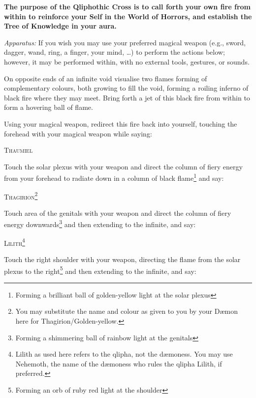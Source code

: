 
\textbf{The purpose of the Qliphothic Cross is to call forth your own fire from within to reinforce your Self in the World of Horrors, and establish the Tree of Knowledge in your aura.}

\textit{Apparatus:} If you wish you may use your preferred magical weapon (e.g., sword, dagger, wand, ring, a finger, your mind, …) to perform the actions below; however, it may be performed within, with no external tools, gestures, or sounds.

On opposite ends of an infinite void visualise two flames forming of complementary colours, both growing to fill the void, forming a roiling inferno of black fire where they may meet. Bring forth a jet of this black fire from within to form a hovering ball of flame.

Using your magical weapon, redirect this fire back into yourself, touching the forehead with your magical weapon while saying:

\begin{quoting}
\textsc{Thaumiel}
\end{quoting}

Touch the solar plexus with your weapon and direct the column of fiery energy from your forehead to radiate down in a column of black flame\footnote{Forming a brilliant ball of golden-yellow light at the solar plexus} and say:

\begin{quoting}
\textsc{Thagirion}\footnote{You may substitute the name and colour as given to you by your D\ae{}mon here for Thagirion/Golden-yellow.}
\end{quoting}

Touch area of the genitals with your weapon and direct the column of fiery energy downwards\footnote{Forming a shimmering ball of rainbow light at the genitals} and then extending to the infinite, and say:

\begin{quoting}
\textsc{Lilith}\footnote{Lilith as used here refers to the qlipha, not the d\ae{}moness. You may use Nehemoth, the name of the d\ae{}moness who rules the qlipha Lilith, if preferred.}
\end{quoting}

Touch the right shoulder with your weapon, directing the flame from the solar plexus to the right\footnote{Forming an orb of ruby red light at the shoulder} and then extending to the infinite, and say:

